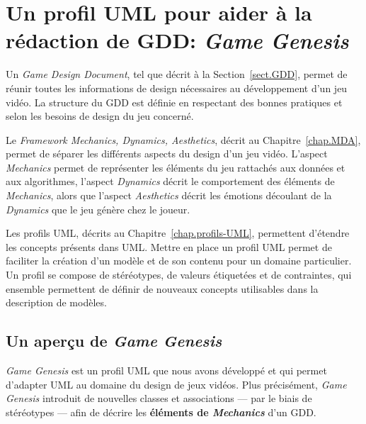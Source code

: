 \chapter{Un profil UML pour aider à la rédaction de GDD: \emph{Game Genesis}}
\label{chap.game-genesis}
\label{game-genesis.sect}

Un \emph{Game Design Document}, tel que décrit à la Section~\ref{sect.GDD}, permet de réunir toutes les informations de design nécessaires au développement d'un jeu vidéo. La structure du GDD est définie en respectant des bonnes pratiques et selon les besoins de design du jeu concerné.



Le \emph{Framework Mechanics, Dynamics, Aesthetics}, décrit au Chapitre~\ref{chap.MDA}, permet de séparer les différents aspects du design d'un jeu vidéo. L'aspect \emph{Mechanics} permet de représenter les éléments du jeu rattachés aux données et aux algorithmes, l'aspect \emph{Dynamics} décrit le comportement des \'el\'ements de \emph{Mechanics}, alors que l'aspect \emph{Aesthetics} d\'ecrit les émotions découlant de la \emph{Dynamics} que le jeu génère chez le joueur.

Les profils UML, décrits au Chapitre~\ref{chap.profils-UML}, permettent d'étendre les concepts présents dans UML. Mettre en place un profil UML permet de faciliter la cr\'eation d'un modèle et de son contenu pour un domaine particulier. Un profil se compose de stéréotypes, de valeurs étiquetées et de contraintes, qui ensemble permettent de d\'efinir de nouveaux concepts utilisables dans la description de modèles.


\section{Un aper\c{c}u de \emph{Game Genesis}}
\label{sect.gg_what}
\emph{Game Genesis} est un profil UML que nous avons d\'evelopp\'e et qui permet d'adapter UML au domaine du design de jeux vidéos. 
Plus précisément, \emph{Game Genesis} introduit de nouvelles classes et associations --- par le biais de st\'er\'eotypes --- afin de décrire les {\bf éléments de \emph{Mechanics}} d'un GDD.

